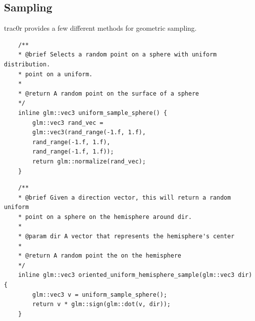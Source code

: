 \documentclass[
  twoside,
  11pt, a4paper,
  footinclude=true,
  headinclude=true,
  cleardoublepage=empty
]{scrreprt}
\begin{document}
\subsection{Sampling}
trac0r provides a few different methods for geometric sampling.

\begin{verbatim}
    /**
    * @brief Selects a random point on a sphere with uniform distribution.
    * point on a uniform.
    *
    * @return A random point on the surface of a sphere
    */
    inline glm::vec3 uniform_sample_sphere() {
        glm::vec3 rand_vec =
        glm::vec3(rand_range(-1.f, 1.f),
        rand_range(-1.f, 1.f),
        rand_range(-1.f, 1.f));
        return glm::normalize(rand_vec);
    }
\end{verbatim}

\begin{verbatim}
    /**
    * @brief Given a direction vector, this will return a random uniform
    * point on a sphere on the hemisphere around dir.
    *
    * @param dir A vector that represents the hemisphere's center
    *
    * @return A random point the on the hemisphere
    */
    inline glm::vec3 oriented_uniform_hemisphere_sample(glm::vec3 dir) {
        glm::vec3 v = uniform_sample_sphere();
        return v * glm::sign(glm::dot(v, dir));
    }
\end{verbatim}
\end{document}
